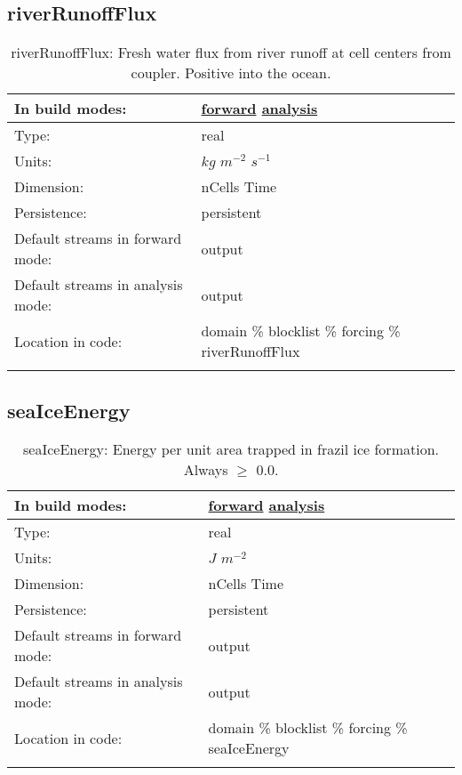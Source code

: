 \subsection[riverRunoffFlux]{riverRunoffFlux}
\label{subsec:var_sec_forcing_riverRunoffFlux}
\begin{center}
\begin{longtable}{| p{2.0in} | p{4.0in} |}
        \hline 
        In build modes: & \hyperref[subsec:forward_var_tab_forcing]{forward} \hyperref[subsec:analysis_var_tab_forcing]{analysis} \\
        \hline 
        Type: & real \\
        \hline 
        Units: & $kg$ $m^{-2}$ $s^{-1}$ \\
        \hline 
        Dimension: & nCells Time \\
        \hline 
        Persistence: & persistent \\
        \hline 
		 Default streams in forward mode: &  output \\
        \hline 
		 Default streams in analysis mode: &  output \\
        \hline 
		 Location in code: & domain \% blocklist \% forcing \% riverRunoffFlux \\
		 \hline 
    \caption{riverRunoffFlux: Fresh water flux from river runoff at cell centers from coupler. Positive into the ocean.}
\end{longtable}
\end{center}
\subsection[seaIceEnergy]{seaIceEnergy}
\label{subsec:var_sec_forcing_seaIceEnergy}
\begin{center}
\begin{longtable}{| p{2.0in} | p{4.0in} |}
        \hline 
        In build modes: & \hyperref[subsec:forward_var_tab_forcing]{forward} \hyperref[subsec:analysis_var_tab_forcing]{analysis} \\
        \hline 
        Type: & real \\
        \hline 
        Units: & $J$ $m^{-2}$ \\
        \hline 
        Dimension: & nCells Time \\
        \hline 
        Persistence: & persistent \\
        \hline 
		 Default streams in forward mode: &  output \\
        \hline 
		 Default streams in analysis mode: &  output \\
        \hline 
		 Location in code: & domain \% blocklist \% forcing \% seaIceEnergy \\
		 \hline 
    \caption{seaIceEnergy:  Energy per unit area trapped in frazil ice formation. Always  $\ge$  0.0.}
\end{longtable}
\end{center}
